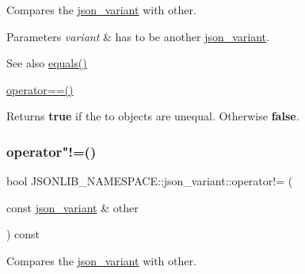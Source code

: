 Compares the \hyperlink{classJSONLIB__NAMESPACE_1_1json__variant}{json\+\_\+variant} with {\ttfamily other}. 


\begin{DoxyParams}{Parameters}
{\em variant} & has to be another \hyperlink{classJSONLIB__NAMESPACE_1_1json__variant}{json\+\_\+variant}. \\
\hline
\end{DoxyParams}
\begin{DoxySeeAlso}{See also}
\hyperlink{classJSONLIB__NAMESPACE_1_1json__variant_ae68b9cb156c2b2f9e12c7f889634b63a}{equals()} 

\hyperlink{classJSONLIB__NAMESPACE_1_1json__variant_aef1fc1a342cc170da06e0d3eb1299aad}{operator==()} 
\end{DoxySeeAlso}
\begin{DoxyReturn}{Returns}
{\bfseries true} if the to objects are unequal. Otherwise {\bfseries false}. 
\end{DoxyReturn}
\mbox{\label{classJSONLIB__NAMESPACE_1_1json__variant_a7672a255983f3142523b3680e737d021}} 
\subsubsection{\texorpdfstring{operator"!=()}{operator!=()}\hspace{0.1cm}{\footnotesize\ttfamily [2/2]}}
{\footnotesize\ttfamily bool J\+S\+O\+N\+L\+I\+B\+\_\+\+N\+A\+M\+E\+S\+P\+A\+C\+E\+::json\+\_\+variant\+::operator!= (\begin{DoxyParamCaption}\item[{const \hyperlink{classJSONLIB__NAMESPACE_1_1json__variant}{json\+\_\+variant} \&}]{other }\end{DoxyParamCaption}) const\hspace{0.3cm}{\ttfamily [inline]}}



Compares the \hyperlink{classJSONLIB__NAMESPACE_1_1json__variant}{json\+\_\+variant} with {\ttfamily other}. 


